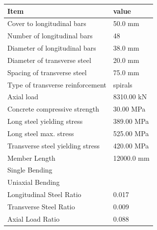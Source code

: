 \begin{table}[htpb]
\begin{tabular}{ll}
Item                             & value      \\ \hline
Cover to longitudinal bars       & 50.0 mm    \\
Number of longitudinal bars      & 48         \\
Diameter of longitudinal bars    & 38.0 mm    \\
Diameter of transverse steel     & 20.0 mm    \\
Spacing of transverse steel      & 75.0 mm    \\
Type of transverse reinforcement  & spirals    \\
Axial load                       & 8310.00 kN \\
Concrete compressive strength    & 30.00 MPa  \\
Long steel yielding stress       & 389.00 MPa \\
Long steel max. stress           & 525.00 MPa \\
Transverse steel yielding stress & 420.00 MPa \\
Member Length                    & 12000.0 mm \\
Single Bending                   &            \\
Uniaxial Bending                 &            \\
Longitudinal Steel Ratio         & 0.017      \\
Transverse Steel Ratio           & 0.009      \\
Axial Load Ratio                 & 0.088     
\end{tabular}
\end{table}

